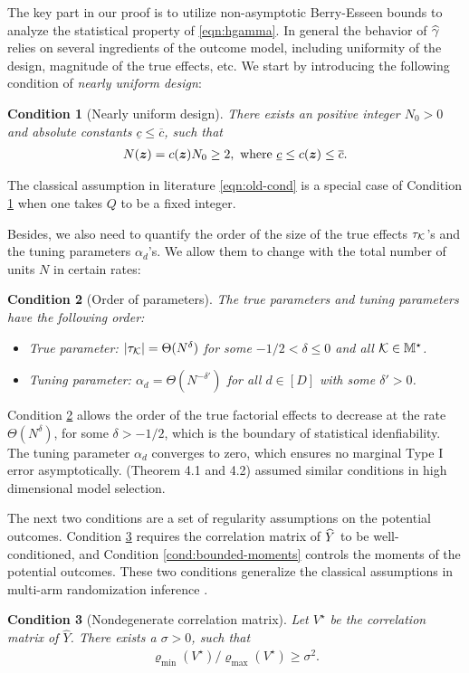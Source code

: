 \documentclass[12pt]{article}
\newtheorem{condition}{Condition}
\begin{document}
The key part in our proof is to utilize non-asymptotic Berry-Esseen bounds to analyze the statistical property of \eqref{eqn:hgamma}. In general the behavior of ${\widehat{\gamma}}$ relies on several ingredients of the outcome model, including uniformity of the design, magnitude of the true effects, etc. We start by introducing the following condition of \textit{nearly uniform design}:
\begin{condition}[Nearly uniform design]\label{cond:uniform-design} There exists an positive integer $N_0 > 0$ and absolute constants $\underline{c} \le \overline{c}$, such that 
\begin{align*}
    N({\boldsymbol{z}}) = c({\boldsymbol{z}})  {N}_0 \ge 2,  \text{ where } \underline{c}\le c({\boldsymbol{z}})\le \overline{c}.
\end{align*}
\end{condition}
The classical assumption in literature \eqref{eqn:old-cond} is a special case of Condition \ref{cond:uniform-design} when one takes $Q$ to be a fixed integer.

Besides, we also need to quantify the order of the size of the true effects $\tau_{\mathcal{K}}$'s and the tuning parameters $\alpha_d$'s. We allow them to change with the total number of units $N$ in certain rates:
\begin{condition}[Order of parameters]\label{cond:order}
The true parameters and tuning parameters have the following order:
\begin{itemize}
    \item True parameter: $|\tau_{\mathcal{K}}| =  \Theta(N^\delta)$ for some $-1/2 < \delta \le 0$ and all ${\mathcal{K}}\in{\mathbb{M}}^\star$.
    \item Tuning parameter: ${\alpha_d} =  \Theta(N^{-\delta'})$ for all $d\in[D]$ with some $\delta' > 0$.
\end{itemize} 
\end{condition}

Condition \ref{cond:order} allows the order of the true factorial effects to decrease at the rate $\Theta(N^\delta)$, for some $\delta > -1/2$, which is the boundary of statistical idenfiability. The tuning parameter $\alpha_d$ converges to zero, which ensures no marginal Type I error asymptotically. \cite{wasserman2009high} (Theorem 4.1 and 4.2) assumed similar conditions in high dimensional model selection.


The next two conditions are a set of regularity assumptions on the potential outcomes. Condition \ref{cond:nondegenerate-corr} requires the correlation matrix of ${\widehat{Y}}$ to be well-conditioned, and Condition \ref{cond:bounded-moments} controls the moments of the potential outcomes. These two conditions generalize the classical assumptions in multi-arm randomization inference \citep{li2017general}.
\begin{condition}[Nondegenerate correlation matrix]\label{cond:nondegenerate-corr}
Let $V^\star$ be the correlation matrix of $\hat{Y}$. There exists a $\sigma > 0$, such that 
    \begin{align}\label{eqn:nondegenerate-var}
        \varrho_{\min}(V^\star)/\varrho_{\max}(V^\star) \ge \sigma^{2}.
    \end{align}
\end{condition}
\end{document}
